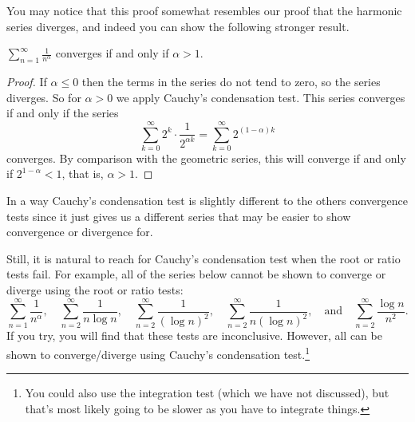 \documentclass[a4paper]{scrartcl}
\begin{document}
You may notice that this proof somewhat resembles our proof that the harmonic series diverges, and indeed you can show the following stronger result.

\begin{theorem}
	$\sum_{n = 1}^{\infty} \frac{1}{n^\alpha}$ converges if and only if $\alpha > 1$.
\end{theorem}
\begin{proof}
If $\alpha \leq 0$ then the terms in the series do not tend to zero, so the series diverges. So for $\alpha > 0$ we apply Cauchy's condensation test. This series converges if and only if the series
$$
\sum_{k = 0}^{\infty} 2^k \cdot \frac{1}{2^{\alpha k}} = \sum_{k = 0}^{\infty} 2^{(1 - \alpha) k}
$$
converges. By comparison with the geometric series, this will converge if and only if $2^{1 - \alpha} < 1$, that is, $\alpha > 1$.
\end{proof}


In a way Cauchy's condensation test is slightly different to the others convergence tests since it just gives us a different series that may be easier to show convergence or divergence for.

Still, it is natural to reach for Cauchy's condensation test when the root or ratio tests fail. For example, all of the series below cannot be shown to converge or diverge using the root or ratio tests:
$$
\sum_{n=1}^{\infty} \frac{1}{n^{\alpha}}, \quad \sum_{n=2}^{\infty} \frac{1}{n \log n}, \quad \sum_{n=2}^{\infty} \frac{1}{(\log n)^{2}}, \quad \sum_{n=2}^{\infty} \frac{1}{n(\log n)^{2}}, \quad \text{and} \quad \sum_{n=2}^{\infty} \frac{\log n}{n^{2}}.
$$
If you try, you will find that these tests are inconclusive. However, all can be shown to converge/diverge using Cauchy's condensation test.\footnote{You could also use the integration test (which we have not discussed), but that's most likely going to be slower as you have to integrate things.}





	
\end{document}
